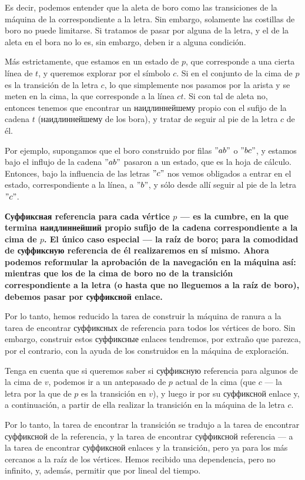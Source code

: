 Es decir, podemos entender que la aleta de boro como las transiciones de la máquina de la correspondiente a la letra. Sin embargo, solamente las costillas de boro no puede limitarse. Si tratamos de pasar por alguna de la letra, y el de la aleta en el bora no lo es, sin embargo, deben ir a alguna condición.

Más estrictamente, que estamos en un estado de $p$, que corresponde a una cierta línea de $t$, y queremos explorar por el símbolo $c$. Si en el conjunto de la cima de $p$ es la transición de la letra $c$, lo que simplemente nos pasamos por la arista y se meten en la cima, la que corresponde a la línea $ct$. Si con tal de aleta no, entonces tenemos que encontrar un наидлиннейшему propio con el sufijo de la cadena $t$ (наидлиннейшему de los bora), y tratar de seguir al pie de la letra $c$ de él.

Por ejemplo, supongamos que el boro construido por filas $"ab"$ o $"bc"$, y estamos bajo el influjo de la cadena $"ab"$ pasaron a un estado, que es la hoja de cálculo. Entonces, bajo la influencia de las letras $"c"$ nos vemos obligados a entrar en el estado, correspondiente a la línea, a $"b"$, y sólo desde allí seguir al pie de la letra $"c"$.

\bf{Суффиксная referencia} para cada vértice $p$ --- es la cumbre, en la que termina наидлиннейший propio sufijo de la cadena correspondiente a la cima de $p$. El único caso especial --- la raíz de boro; para la comodidad de суффиксную referencia de él realizaremos en sí mismo. Ahora podemos reformular la aprobación de la navegación en la máquina así: mientras que los de la cima de boro no de la transición correspondiente a la letra (o hasta que no lleguemos a la raíz de boro), debemos pasar por суффиксной enlace.

Por lo tanto, hemos reducido la tarea de construir la máquina de ranura a la tarea de encontrar суффиксных de referencia para todos los vértices de boro. Sin embargo, construir estos суффиксные enlaces tendremos, por extraño que parezca, por el contrario, con la ayuda de los construidos en la máquina de exploración.

Tenga en cuenta que si queremos saber si суффиксную referencia para algunos de la cima de $v$, podemos ir a un antepasado de $p$ actual de la cima (que $c$ --- la letra por la que de $p$ es la transición en $v$), y luego ir por su суффиксной enlace y, a continuación, a partir de ella realizar la transición en la máquina de la letra $c$.

Por lo tanto, la tarea de encontrar la transición se tradujo a la tarea de encontrar суффиксной de la referencia, y la tarea de encontrar суффиксной referencia --- a la tarea de encontrar суффиксной enlaces y la transición, pero ya para los más cercanos a la raíz de los vértices. Hemos recibido una dependencia, pero no infinito, y, además, permitir que por lineal del tiempo.

